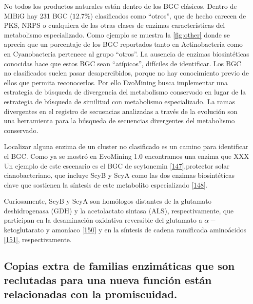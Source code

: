 \documentclass[12pt,twoside]{reedthesis}
\begin{document}
  No todos los productos naturales están dentro de los BGC clásicos.
  Dentro de MIBiG hay 231 BGC (\(12.7\%\)) clasificados como ``otros'',
  que de hecho carecen de PKS, NRPS o cualquiera de las otras clases de
  enzimas características del metabolismo especializado. Como ejemplo se
  muestra la \autoref{fig:other} donde se aprecia que un porcentaje de los
  BGC reportados tanto en Actinobacteria como en Cyanobacteria pertenece
  al grupo ``otros''. La ausencia de enzimas biosintéticas conocidas hace
  que estos BGC sean ``atípicos'', difíciles de identificar. Los BGC no
  clasificados suelen pasar desapercibidos, porque no hay conocimiento
  previo de ellos que permita reconocerlos. Por ello EvoMining busca
  implementar una estrategia de búsqueda de divergencia del metabolismo
  conservado en lugar de la estrategia de búsqueda de similitud con
  metabolismo especializado. La ramas divergentes en el registro de
  secuencias analizadas a través de la evolución son una herramienta para
  la búsqueda de secuencias divergentes del metabolismo conservado.
  
  Localizar alguna enzima de un cluster no clasificado es un camino para
  identificar el BGC. Como ya se mostró en EvoMining 1.0 encontramos una
  enzima que XXX Un ejemplo de este escenario es el BGC de scytonemin
  {[}\protect\hyperlink{ref-garciapichel_evidence_1992}{147}{]},protector
  solar cianobacteriano, que incluye ScyB y ScyA como las dos enzimas
  biosintéticas clave que sostienen la síntesis de este metabolito
  especializado
  {[}\protect\hyperlink{ref-balskus_investigating_2008}{148}{]}.
  
  Curiosamente, ScyB y ScyA son homólogos distantes de la glutamato
  deshidrogenasa (GDH) y la acetolactato sintasa (ALS), respectivamente,
  que participan en la desaminación oxidativa reversible del glutamato a
  \(\alpha-\)ketoglutarato y amoníaco
  {[}\protect\hyperlink{ref-engel_glutamate_2014}{150}{]} y en la síntesis
  de cadena ramificada aminoácidos
  {[}\protect\hyperlink{ref-liu_acetohydroxyacid_2016}{151}{]},
  respectivamente.
  
  \subsection{Copias extra de familias enzimáticas que son reclutadas para
  una nueva función están relacionadas con la
  promiscuidad.}\label{copias-extra-de-familias-enzimaticas-que-son-reclutadas-para-una-nueva-funcion-estan-relacionadas-con-la-promiscuidad.}
  
\end{document}
